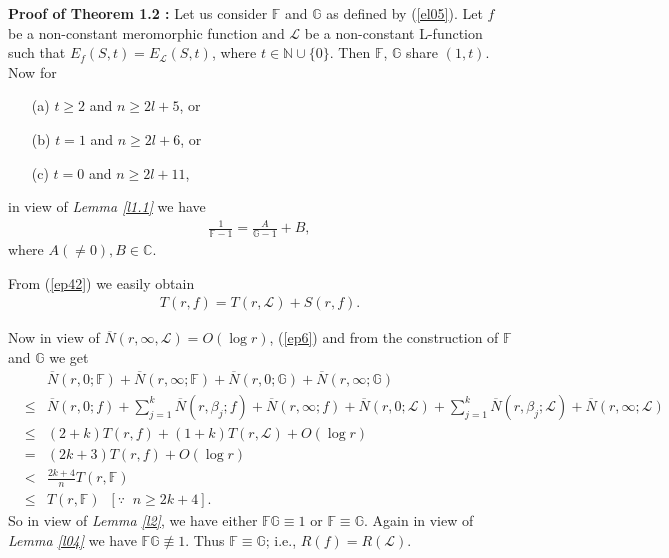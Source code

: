 \documentclass[a4paper,draft]{amsproc}
\theoremstyle{plain}
\theoremstyle{definition}
\theoremstyle{remark}
\newcommand{\ol}{\overline}
\newcommand{\beas}{\begin{eqnarray*}}
\newcommand{\eeas}{\end{eqnarray*}}
\newcommand{\bea}{\begin{eqnarray}}
\newcommand{\eea}{\end{eqnarray}}
\numberwithin{equation}{section}
\renewcommand{\leq}{\leqslant}\renewcommand{\geq}{\geqslant}
\begin{document}
{\bf Proof of Theorem 1.2 :} Let us consider $\mathbb{F}$ and $\mathbb{G}$ as defined by (\ref{el05}). %
Let $f$ be a non-constant meromorphic function and $\mathcal{L}$ be a non-constant L-function such that  %
$E_f(S,t)=E_{\mathcal{L}}(S,t)$, where $t\in\mathbb{N}\cup\{0\}$. Then $\mathbb{F}$, $\mathbb{G}$ share $(1,t)$. 
Now for  \begin{itemize}
\item [(a)]$t\geq 2$ and $n\geq 2l+5$, or
\item [(b)] $t=1$ and $n\geq 2l+6$, or
\item [(c)] $t=0$ and $n\geq 2l+11$,
\end{itemize}
in view of  {\em Lemma \ref{l1.1}} we have
\bea\label{ep42}\frac{1}{\mathbb{F}-1}=\frac{A}{\mathbb{G}-1}+B,\eea where $A(\neq0), B\in\mathbb{C}$. %


From (\ref{ep42})  we easily obtain \bea \label{ep6}T(r,f) = T(r,\mathcal{L}) + S(r,f).\eea
\par Now in view of  $\ol{N}(r,\infty,\mathcal{L})=O(\log r)$, (\ref{ep6}) and from the construction of $\mathbb{F}$ and $\mathbb{G}$ we get 
\beas &&
\ol{N}(r,0; \mathbb{F})+	\ol{N}(r,\infty; \mathbb{F})+	\ol{N}(r,0; \mathbb{G})+	\ol{N}(r,\infty; \mathbb{G})
\\ &\leq&\ol{N}(r,0;f)+\sum_{j=1}^{k}\ol{N}(r,\beta_j;f)+\ol{N}(r,\infty;f)+\ol{N}(r,0;\mathcal{L})+\sum_{j=1}^{k}\ol{N}(r,\beta_j;\mathcal{L})+\ol{N}(r,\infty;\mathcal{L})
\\ &\leq& (2+k)T(r,f)+(1+k)T(r,\mathcal{L})+O(\log r)\\
&=&(2k+3)T(r,f)+O(\log r)\\
&<&\frac{2k+4}{n}T(r,\mathbb{F})\\\nonumber
&\leq&T(r,\mathbb{F}){\;\;}[\because\;\; n\geq 2k+4].
\eeas
So in view of {\em Lemma \ref{l2}}, we have either $\mathbb{F}\mathbb{G} \equiv 1$ or $\mathbb{F} \equiv \mathbb{G}$.
Again in view of {\em Lemma \ref{l04}} we have  $\mathbb{F}\mathbb{G} \not\equiv1$. Thus $\mathbb{F} \equiv \mathbb{G}$; i.e., $R(f)=R(\mathcal{L})$.
\end{document}
